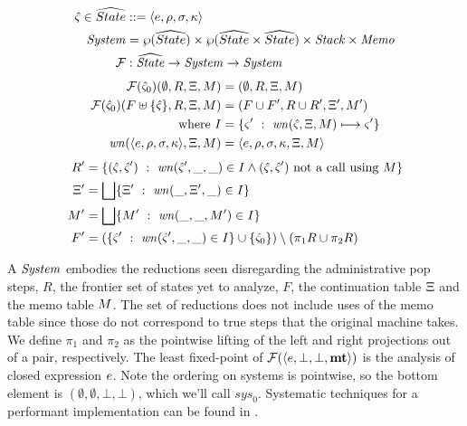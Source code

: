 {
\setlength{\abovedisplayskip}{0pt}
\setlength{\belowdisplayskip}{4pt}
\setlength{\abovedisplayshortskip}{0pt}
\setlength{\belowdisplayshortskip}{8pt}
\begin{align*}
  \hat\varsigma \in \widehat{State} &::= \langle e,\rho,\sigma,\kappa \rangle \\
  \mathit{System} &= \wp(\widehat{State}) \times \wp(\widehat{State} \times \widehat{State}) \times \mathit{Stack} \times \mathit{Memo} \\
  {\mathcal F} &: \widehat{\mathit{State}} \to \mathit{System} \to \mathit{System}
\end{align*}
\begin{align*}
  {\mathcal F}(\hat\varsigma_0)(\emptyset, R, \Xi, M) &= (\emptyset, R, \Xi, M) \\
  {\mathcal F}(\hat\varsigma_0)(F\uplus\{ \hat\varsigma \}, R, \Xi, M) &= (F\cup F', R \cup R', \Xi', M') \\
  \text{where } I &= \{ \varsigma'\ :\ \mathit{wn}(\hat\varsigma,\Xi,M) \longmapsto \varsigma'\} \\
                \mathit{wn}(\langle e,\rho,\sigma,\kappa \rangle,\Xi,M)
                   &= \langle e,\rho,\sigma,\kappa,\Xi,M \rangle
\end{align*}
\begin{align*}
    R' &= \{ (\hat\varsigma,\hat\varsigma')\ :\ \mathit{wn}(\hat\varsigma', \_, \_) \in I \wedge (\hat\varsigma,\hat\varsigma') \text{ not a call using } M\} \\
    \Xi' &=  \bigsqcup\{ \Xi'\ :\ \mathit{wn}(\_, \Xi', \_) \in I\} \\
    M' &= \bigsqcup\{ M'\ :\ \mathit{wn}(\_, \_, M') \in I\} \\
    F' &= (\{ \hat\varsigma'\ :\ \mathit{wn}(\hat\varsigma', \_, \_) \in I\} \cup \{ \hat\varsigma_0 \})\setminus (\pi_1 R \cup \pi_2 R)
  \end{align*}
}

A $\mathit{System}$ embodies the reductions seen disregarding the administrative pop steps, $R$, the frontier set of states yet to analyze, $F$, the continuation table $\Xi$ and the memo table $M$.
%
The set of reductions does not include uses of the memo table since those do not correspond to true steps that the original machine takes.
%
We define $\pi_1$ and $\pi_2$ as the pointwise lifting of the left and right projections out of a pair, respectively.
%
%
%
%
The least fixed-point of ${\mathcal F}(\langle e,\bot,\bot,\mathbf{mt} \rangle)$ is the analysis of closed expression $e$.
%
Note the ordering on systems is pointwise, so the bottom element is $(\emptyset,\emptyset,\bot,\bot)$, which we'll call $\mathit{sys}_0$.
%
Systematic techniques for a performant implementation can be found in \citet{ianjohnson:oaam:icfp2013}.
%

